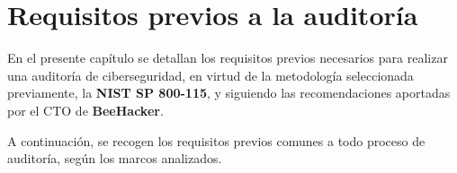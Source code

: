 \documentclass[a4paper, 11pt]{article}
\begin{document}
\clearpage

\thispagestyle{nohead}






\section{Requisitos previos a la auditoría}

En el presente capítulo se detallan los requisitos previos necesarios para realizar una auditoría de ciberseguridad, en virtud de la metodología seleccionada previamente, la \textbf{NIST SP 800-115}, y siguiendo las recomendaciones aportadas por el CTO de \textbf{BeeHacker}. 


A continuación, se recogen los requisitos previos comunes a todo proceso de auditoría, según los marcos analizados.
\end{document}
